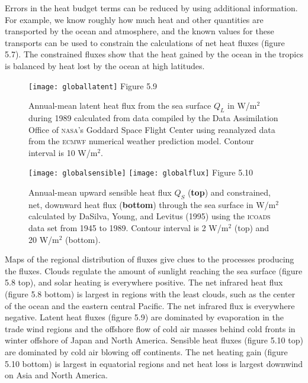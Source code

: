 Errors in the heat budget terms can be reduced by using additional
information. For example, we know roughly how much heat and other
quantities are transported by the ocean and
atmosphere, and the known values for these transports can be used to
constrain the calculations of net heat fluxes
(figure 5.7). The constrained fluxes show that the heat gained by the
ocean in the tropics is balanced by heat lost by the ocean at high
latitudes.

\begin{figure}[t!]
\texttt{[image: globallatent]}
\footnotesize
Figure 5.9 \rule{0mm}{3ex}Annual-mean latent heat flux from the sea surface $Q_{L}$ in W/m$^2$ during
1989 calculated from data compiled by the Data Assimilation Office of \textsc{nasa}'s Goddard Space Flight Center
using reanalyzed data from the \textsc{ecmwf} numerical weather
prediction model. Contour interval is 10 W/m$^2$.
\label{fig:globallatent}
\vspace{-3ex}
\end{figure}

\begin{figure}[t!]
\texttt{[image: globalsensible]}
\texttt{[image: globalflux]}
\footnotesize
Figure 5.10 \rule{0mm}{3ex}Annual-mean upward sensible heat
flux $Q_{S}$ (\textbf{top})
and constrained, net, downward heat flux (\textbf{bottom}) through the
sea surface in W/m$^2$ calculated by DaSilva, Young, and Levitus
(1995) using the \textsc{icoads} data set from 1945 to 1989. Contour
interval is 2 W/m$^2$ (top) and 20 W/m$^2$ (bottom).
\label{fig:globalsensible}
\vspace{-5ex}
\end{figure}

Maps of the regional distribution of fluxes give clues to the
processes producing the fluxes. Clouds regulate the amount of sunlight
reaching the sea surface (figure 5.8 top), and solar heating is
everywhere positive.  The net infrared heat flux
(figure 5.8 bottom) is largest in regions with the least clouds, such
as the center of the ocean and the eastern central Pacific. The net
infrared flux is everywhere negative. Latent heat fluxes (figure 5.9)
are dominated by evaporation in the trade wind regions and the
offshore flow of cold air masses behind cold fronts in winter offshore
of Japan and North America.  Sensible heat fluxes (figure 5.10 top) are dominated by cold air blowing
off continents. The net heating gain (figure 5.10 bottom) is largest
in equatorial regions and net heat loss is largest downwind on Asia
and North America.

